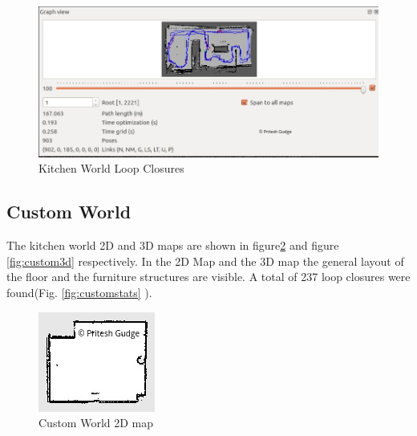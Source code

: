 \documentclass[10pt,journal,compsoc]{IEEEtran}
\begin{document}
\begin{figure}[thpb]
      \centering
      \includegraphics[width=\linewidth]{images/loop_closures}
      \caption{Kitchen World Loop Closures}
      \label{fig:kitchenloop}
\end{figure}

\subsection{Custom World}
The kitchen world 2D and 3D maps are shown in figure\ref{fig:custom2d} and figure \ref{fig:custom3d} respectively. In the 2D Map and the 3D map the general layout of the floor and the furniture structures are visible. A total of 237 loop closures were found(Fig. \ref{fig:customstats} ).

\begin{figure}[thpb]
      \centering
      \includegraphics[width=\linewidth]{images/map2_2d}
      \caption{Custom World 2D map}
      \label{fig:custom2d}
\end{figure}
\end{document}
